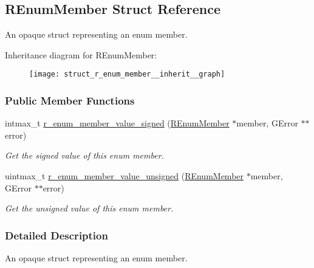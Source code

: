 \hypertarget{struct_r_enum_member}{\subsection{R\-Enum\-Member Struct Reference}
\label{struct_r_enum_member}
}


An opaque struct representing an enum member.  




Inheritance diagram for R\-Enum\-Member\-:\nopagebreak
\begin{figure}[H]
\begin{center}
\leavevmode
\texttt{[image: struct\_r\_enum\_member\_\_inherit\_\_graph]}
\end{center}
\end{figure}
\subsubsection*{Public Member Functions}
\begin{DoxyCompactItemize}
\item 
intmax\-\_\-t \hyperlink{struct_r_enum_member_a026237d059e873232fcc22329409ba11}{r\-\_\-enum\-\_\-member\-\_\-value\-\_\-signed} (\hyperlink{struct_r_enum_member}{R\-Enum\-Member} $\ast$member, G\-Error $\ast$$\ast$error)
\begin{DoxyCompactList}\small\item\em Get the signed value of this enum member. \end{DoxyCompactList}\item 
uintmax\-\_\-t \hyperlink{struct_r_enum_member_a866b3ca4d98b9161f06ad5f2eca7a124}{r\-\_\-enum\-\_\-member\-\_\-value\-\_\-unsigned} (\hyperlink{struct_r_enum_member}{R\-Enum\-Member} $\ast$member, G\-Error $\ast$$\ast$error)
\begin{DoxyCompactList}\small\item\em Get the unsigned value of this enum member. \end{DoxyCompactList}\end{DoxyCompactItemize}


\subsubsection{Detailed Description}
An opaque struct representing an enum member. 

